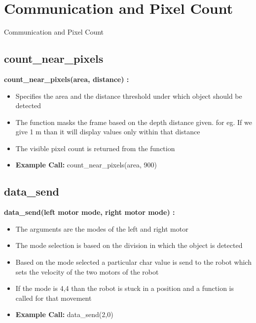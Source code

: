 \documentclass[10pt, a4paper]{beamer}
\begin{document}
\section{Communication and Pixel Count}
\begin{frame}[allowframebreaks]{Communication and Pixel Count}
  \subsection{count\_near\_pixels}
    \textbf{count\_near\_pixels(area, distance) : }
      \begin{itemize}
       \item Specifies the area and the distance threshold under which object should be detected
       \item The function masks the frame based on the depth distance given. for eg. If we give 1 m than it will display values only within that distance
       \item The visible pixel count is returned from the function
       \item \textbf{Example Call:} count\_near\_pixels(area, 900)
      \end{itemize}
\framebreak
  \subsection{data\_send}
    \textbf{data\_send(left motor mode, right motor mode) : }
      \begin{itemize}
       \item The arguments are the modes of the left and right motor
       \item The mode selection is based on the division in which the object is detected
       \item Based on the mode selected a particular char value is send to the robot which sets the velocity of the two motors of the robot
       \item If the mode is 4,4 than the robot is stuck in a position and a function is called for that movement
       \item \textbf{Example Call:} data\_send(2,0)
      \end{itemize}
\end{frame}
\end{document}
